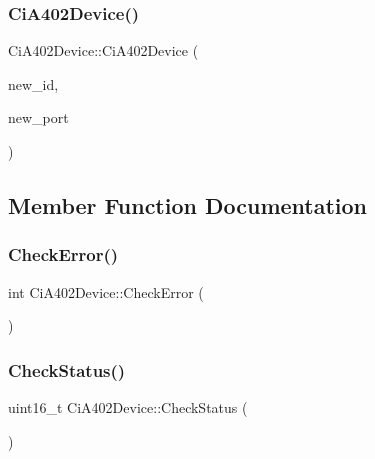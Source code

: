 \mbox{\label{classCiA402Device_a017bcbc5d6e7a87b950b3cf2fcff1c41}} 
\subsubsection{\texorpdfstring{Ci\+A402\+Device()}{CiA402Device()}\hspace{0.1cm}{\footnotesize\ttfamily [4/4]}}
{\footnotesize\ttfamily Ci\+A402\+Device\+::\+Ci\+A402\+Device (\begin{DoxyParamCaption}\item[{uint8\+\_\+t}]{new\+\_\+id,  }\item[{\hyperlink{classPortBase}{Port\+Base} $\ast$}]{new\+\_\+port }\end{DoxyParamCaption})}



\subsection{Member Function Documentation}
\mbox{\label{classCiA402Device_af1ed15805579e85e514e7ccf4ff21e10}} 
\subsubsection{\texorpdfstring{Check\+Error()}{CheckError()}}
{\footnotesize\ttfamily int Ci\+A402\+Device\+::\+Check\+Error (\begin{DoxyParamCaption}{ }\end{DoxyParamCaption})}

\mbox{\label{classCiA402Device_a5a034b00c87d2ec9ec98157b772465d9}} 
\subsubsection{\texorpdfstring{Check\+Status()}{CheckStatus()}}
{\footnotesize\ttfamily uint16\+\_\+t Ci\+A402\+Device\+::\+Check\+Status (\begin{DoxyParamCaption}{ }\end{DoxyParamCaption})}



